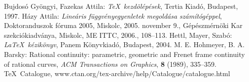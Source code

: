 \begin{thebibliography}{x}
 Bujdosó Gyöngyi, Fazekas Attila: {\em\TeX\ kezdõlépések}, Tertia Kiadó, Budapest, 1997.
 Házy Attila: {\em Lineáris függvényegyenletek megoldása számítógéppel}, Doktoranduszok fóruma 2005, Miskolc, 2005. november 9., Gépészmérnöki Kar szekciókiadványa, Miskolc, ME ITTC, 2006., 108--113.
 Hettl, Mayer, Szabó: {\em \LaTeX\ kézikönyv}, Panem Könyvkiadó, Budapest, 2004.
 M. E. Hohmeyer, B. A. Barsky: Rational continuity: parametric, geometric and Frenet frame
continuity of rational curves, {\em ACM Transactions on Graphics}, \textbf{8} (1989), 335--359.
 \TeX\ Catalogue, {\ttfamily www.ctan.org/tex-archive/help/Catalogue/catalogue.html} 
\end{thebibliography}

\newpage
